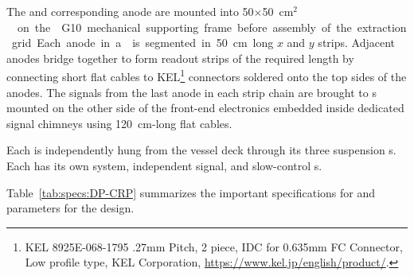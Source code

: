 The  and corresponding anode are mounted into 
\num{50}$\times$\SI{50}{cm$^2$}  
 on the  G10 mechanical supporting frame before assembly of the extraction grid. Each anode in a  is segmented in \SI{50}{cm} long $x$ and $y$ strips. Adjacent  anodes bridge together to form readout strips of the required length by connecting short flat cables to KEL\footnote{KEL 8925E-068-1795 .27mm Pitch, 2 piece, IDC for 0.635mm FC Connector, Low profile type, KEL Corporation\texttrademark{}, \url{https://www.kel.jp/english/product/}.} connectors soldered onto the top sides of the anodes. The signals from the last anode in each  strip chain are brought to \fdth{}s mounted on the other side of the front-end electronics embedded inside dedicated signal \fdth chimneys using \SI{120}{cm}-long flat cables.

Each  is independently hung from the vessel deck through its three suspension \fdth{}s. Each has its own  system, independent signal, and slow-control \fdth{}s.

Table~\ref{tab:specs:DP-CRP} summarizes the important specifications for  and parameters for the  design. 



